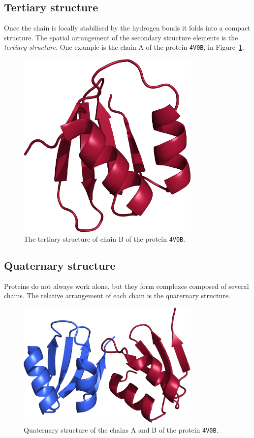 \subsection{Tertiary structure}
Once the chain is locally stabilised by the hydrogen bonds it folds into a compact structure.
The spatial arrangement of the secondary structure elements is the \emph{tertiary structure.}
One example is the chain A of the protein \texttt{4V0B}, in Figure~\ref{fig:tertiary}.

\begin{figure}[htb]
\centering
\includegraphics[width=0.8\textwidth]{bioinfo/figures/tertiary}
\caption{The tertiary structure of chain B of the protein \texttt{4V0B}.}\label{fig:tertiary}
\end{figure}

\subsection{Quaternary structure}
Proteins do not always work alone, but they form complexes composed of several chains.
The relative arrangement of each chain is the quaternary structure.

\begin{figure}[htb]
\centering
\includegraphics[width=0.8\textwidth]{bioinfo/figures/quaternary}
\caption{Quaternary structure of the chains A and B of the protein \texttt{4V0B}.}\label{fig:quaternary}
\end{figure}

